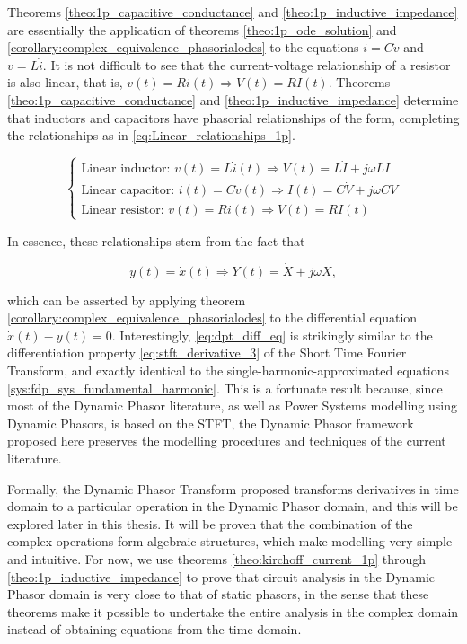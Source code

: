 	Theorems \ref{theo:1p_capacitive_conductance} and \ref{theo:1p_inductive_impedance} are essentially the application of theorems \ref{theo:1p_ode_solution} and \ref{corollary:complex_equivalence_phasorialodes} to the equations $i = C\dot{v}$ and $v = L\dot{i}$. It is not difficult to see that the current-voltage relationship of a resistor is also linear, that is, $v(t) = Ri(t) \Rightarrow V(t) = RI(t)$. Theorems \ref{theo:1p_capacitive_conductance} and \ref{theo:1p_inductive_impedance} determine that inductors and capacitors have phasorial relationships of the form, completing the relationships as in \eqref{eq:Linear_relationships_1p}.

\begin{equation} \left\{\begin{array}{l} \text{Linear inductor: } v(t) = L \dot{i}(t) \Rightarrow V(t) = L\dot{I} + j\omega L I \\[3mm] \text{Linear capacitor: } i(t) = C \dot{v}(t) \Rightarrow I(t) = C\dot{V} + j\omega C V \\[3mm] \text{Linear resistor: } v(t) = Ri(t) \Rightarrow V(t) = RI(t) \end{array}\right. \label{eq:Linear_relationships_1p} \end{equation}

	In essence, these relationships stem from the fact that

\begin{equation} y(t) = \dot{x}(t) \Rightarrow Y(t) = \dot{X} + j\omega X, \label{eq:dpt_diff_eq}\end{equation}

	\noindent which can be asserted by applying theorem \ref{corollary:complex_equivalence_phasorialodes} to the differential equation $\dot{x}(t) - y(t) = 0$. Interestingly, \eqref{eq:dpt_diff_eq} is strikingly similar to the differentiation property \eqref{eq:stft_derivative_3} of the Short Time Fourier Transform, and exactly identical to the single-harmonic-approximated equations \eqref{sys:fdp_sys_fundamental_harmonic}. This is a fortunate result because, since most of the Dynamic Phasor literature, as well as Power Systems modelling using Dynamic Phasors, is based on the STFT, the Dynamic Phasor framework proposed here preserves the modelling procedures and techniques of the current literature.

	Formally, the Dynamic Phasor Transform proposed transforms derivatives in time domain to a particular operation in the Dynamic Phasor domain, and this will be explored later in this thesis. It will be proven that the combination of the complex operations form algebraic structures, which make modelling very simple and intuitive. For now, we use theorems \ref{theo:kirchoff_current_1p} through \ref{theo:1p_inductive_impedance} to prove that circuit analysis in the Dynamic Phasor domain is very close to that of static phasors, in the sense that these theorems make it possible to undertake the entire analysis in the complex domain instead of obtaining equations from the time domain.

